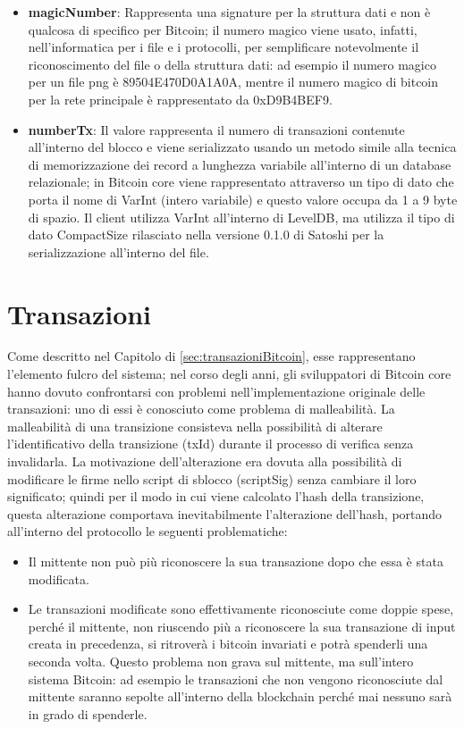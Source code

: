 \begin{itemize}
  \setlength\itemsep{1em}
  \item {\bf magicNumber\/}: Rappresenta una signature per la struttura dati e non è qualcosa di specifico per Bitcoin; il numero magico viene usato, infatti, nell’informatica per i file e i protocolli, per semplificare notevolmente il riconoscimento del file o della struttura dati: ad esempio il numero magico per un file png è 89504E470D0A1A0A, mentre il numero magico di bitcoin per la rete principale è rappresentato da 0xD9B4BEF9.
  \item {\bf numberTx\/}: Il valore rappresenta il numero di transazioni contenute all'interno del blocco e viene serializzato usando un metodo simile alla tecnica di memorizzazione dei record a lunghezza variabile all’interno di un database relazionale; in Bitcoin core viene rappresentato attraverso un tipo di dato che porta il nome di VarInt (intero variabile) e questo valore occupa da 1 a 9 byte di spazio.
  Il client utilizza VarInt all’interno di LevelDB, ma utilizza il tipo di dato CompactSize rilasciato nella versione 0.1.0 di Satoshi per la serializzazione all’interno del file.
\end{itemize}

\section{Transazioni}
\label{sec:transazionibitcoincore}
Come descritto nel Capitolo di \ref{sec:transazioniBitcoin}, esse rappresentano l’elemento fulcro del sistema; nel corso degli anni, gli sviluppatori di Bitcoin core hanno dovuto confrontarsi con problemi nell’implementazione originale delle transazioni: uno di essi è conosciuto come problema di malleabilità.
La malleabilità di una transizione consisteva nella possibilità di alterare l’identificativo della transizione (txId) durante il processo di verifica senza invalidarla. La motivazione dell’alterazione era dovuta alla possibilità di modificare le firme nello script di sblocco (scriptSig) senza cambiare il loro significato; quindi per il modo in cui viene calcolato l’hash della transizione, questa alterazione comportava inevitabilmente l’alterazione dell’hash, portando all’interno del protocollo le seguenti problematiche:
\begin{itemize}
  \item Il mittente non può più riconoscere la sua transazione dopo che essa è stata modificata.
  \item Le transazioni modificate sono effettivamente riconosciute come doppie spese, perché il mittente, non riuscendo più a riconoscere la sua transazione di input creata in precedenza, si ritroverà i bitcoin invariati e potrà spenderli una seconda volta.
  Questo problema non grava sul mittente, ma sull’intero sistema Bitcoin: ad esempio le transazioni che non vengono riconosciute dal mittente saranno sepolte all’interno della blockchain perché mai nessuno sarà in grado di spenderle.
\end{itemize}

